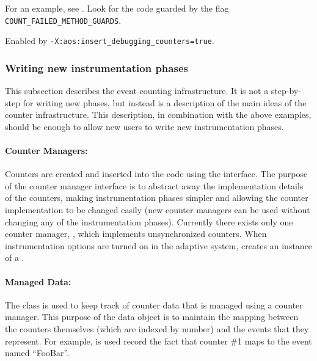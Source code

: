 \begin{enumerate}
For an example, see 
.  
Look
for the code guarded by the flag {\tt COUNT\_\-FAILED\_\-ME\-THOD\_\-GUARDS}.
 
Enabled by {\tt -X:aos:insert\_debugging\_counters=true}.

\end{enumerate}

\subsubsection{Writing new instrumentation phases}
\label{adding_phases}
This subsection describes the event counting infrastructure.  It is
not a step-by-step for writing new phases, but instead is a
description of the main ideas of the counter infrastructure.
This description, in combination with the above examples, should be
enough to allow new users to write new instrumentation phases.

\paragraph{Counter Managers:}  Counters are created and inserted into
the code using the 
interface.
The purpose of the counter manager interface is to abstract away the
implementation details of the counters, making instrumentation
phases simpler and allowing the counter implementation to be changed
easily (new counter managers can be used without changing any of the
instrumentation phases).  Currently there exists only one counter
manager, 
, which implements unsynchronized
counters.
When instrumentation options
are turned on in the adaptive system, 
creates an instance of a .

\paragraph{Managed Data:} The class 
is used to
keep track of counter data that is managed using a counter
manager. This purpose of the data object is to maintain the mapping
between the counters themselves (which are indexed by number) and the
events that they represent.  For example, 
is used record the fact that counter \#1
maps to the event named ``FooBar''.  

